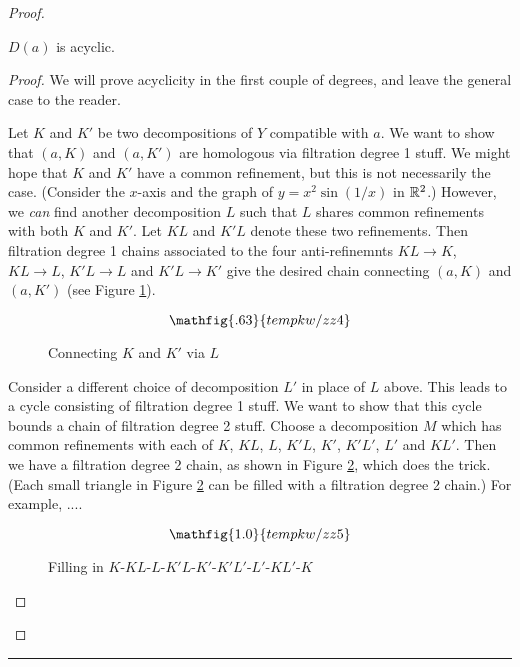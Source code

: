 \begin{proof}
\begin{lemma}
$D(a)$ is acyclic.
\end{lemma}

\begin{proof}
We will prove acyclicity in the first couple of degrees, and 
leave the general case to the reader.

Let $K$ and $K'$ be two decompositions of $Y$ compatible with $a$.
We want to show that $(a, K)$ and $(a, K')$ are homologous via filtration degree 1 stuff.
We might hope that $K$ and $K'$ have a common refinement, but this is not necessarily
the case.
(Consider the $x$-axis and the graph of $y = x^2\sin(1/x)$ in $\mathbb{R}^2$.)
However, we {\it can} find another decomposition $L$ such that $L$ shares common
refinements with both $K$ and $K'$.
Let $KL$ and $K'L$ denote these two refinements.
Then filtration degree 1 chains associated to the four anti-refinemnts
$KL\to K$, $KL\to L$, $K'L\to L$ and $K'L\to K'$
give the desired chain connecting $(a, K)$ and $(a, K')$
(see Figure \ref{zzz4}).

\begin{figure}[!ht]
\begin{equation*}
\mathfig{.63}{tempkw/zz4}
\end{equation*}
\caption{Connecting $K$ and $K'$ via $L$}
\label{zzz4}
\end{figure}

Consider a different choice of decomposition $L'$ in place of $L$ above.
This leads to a cycle consisting of filtration degree 1 stuff.
We want to show that this cycle bounds a chain of filtration degree 2 stuff.
Choose a decomposition $M$ which has common refinements with each of 
$K$, $KL$, $L$, $K'L$, $K'$, $K'L'$, $L'$ and $KL'$.
Then we have a filtration degree 2 chain, as shown in Figure \ref{zzz5}, which does the trick.
(Each small triangle in Figure \ref{zzz5} can be filled with a filtration degree 2 chain.)
For example, ....

\begin{figure}[!ht]
\begin{equation*}
\mathfig{1.0}{tempkw/zz5}
\end{equation*}
\caption{Filling in $K$-$KL$-$L$-$K'L$-$K'$-$K'L'$-$L'$-$KL'$-$K$}
\label{zzz5}
\end{figure}

\end{proof}


\end{proof}





\medskip
\hrule
\medskip

\medskip

